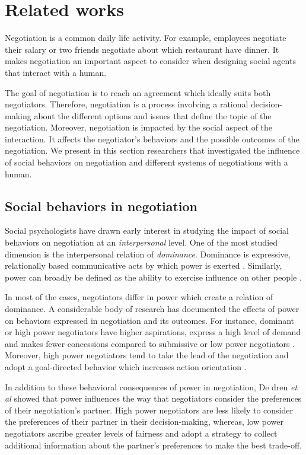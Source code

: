 \documentclass[runningheads,a4paper]{llncs}
\begin{document}
	\section{Related works}	
		Negotiation is a common daily life activity. For example, employees negotiate their salary or two friends negotiate about which restaurant have dinner. It makes negotiation an important aspect to consider when designing social agents that interact with a human.
		
		 The goal of negotiation is to reach an agreement which ideally suits both negotiators. Therefore, negotiation is a process involving a rational decision-making about the different options and issues that define the topic of the negotiation. Moreover, negotiation is impacted by the social aspect of the interaction. It affects the negotiator's behaviors and the possible outcomes of the negotiation. We present in this section researchers that investigated the influence of social behaviors on negotiation and different systems of negotiations with a human.
		
		\subsection{Social behaviors in negotiation}
			
			Social psychologists have drawn early interest in studying the impact of social behaviors on negotiation at an \emph{interpersonal} level. One of the most studied dimension is the interpersonal relation of \emph{dominance}. Dominance is expressive, relationally based communicative acts by which power is exerted \cite{burgoonnonverbal}. Similarly, power can broadly be defined as the ability to exercise influence on other people \cite{van2006power}.

			
			In most of the cases, negotiators differ in power \cite{van2006power} which create a relation of dominance. A considerable body of research has documented the effects of power on behaviors expressed in negotiation and its outcomes. For instance, dominant or high power negotiators have higher aspirations, express a high level of demand and makes fewer concessions compared to submissive or low power negotiators \cite{de1995impact}. Moreover, high power negotiators tend to take the lead of the negotiation and adopt a goal-directed behavior which increases action orientation \cite{galinsky2003power}.
			
			In addition to these behavioral consequences of power in negotiation, De dreu  \textit{et al} \cite{de2004influence,fiske1993controlling} showed that power influences the way that negotiators consider the preferences of their negotiation's partner. High power negotiators are less likely to consider the preferences of their partner in their decision-making, whereas, low power negotiators ascribe greater levels of fairness and adopt a strategy to collect additional information about the partner's preferences \cite{de2004influence} to make the best trade-off.
			
\end{document}
